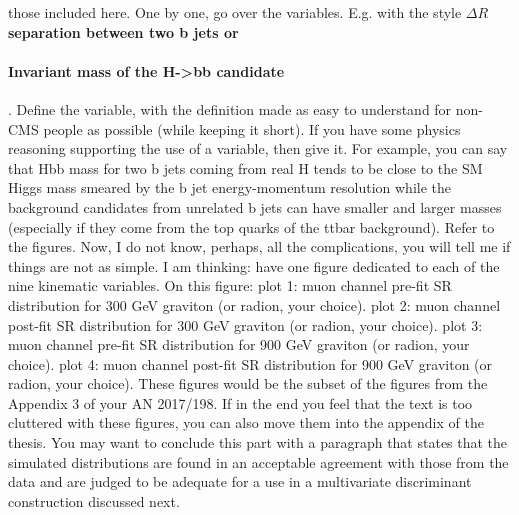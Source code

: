            those included here.
              One by one, go over the variables. E.g. with the style
           \bf{$\Delta R$ separation between two b jets} or \paragraph{Invariant mass of the H->bb candidate}.
           Define the variable, with the definition made as easy to understand for non-CMS people as
           possible (while keeping it short). If you have some physics reasoning supporting the use 
           of a variable, then give it. For example, you can say that Hbb mass for two b jets coming
           from real H tends to be close to the SM Higgs mass smeared by the b jet energy-momentum
           resolution while the background candidates from unrelated b jets can have smaller and larger
           masses (especially if they come from the top quarks of the ttbar background).
           Refer to the figures. 
           Now, I do not  know, perhaps, all the complications, you will tell me if things are not as simple.
           I am thinking: have one figure dedicated to each of the nine kinematic variables. On this figure:
               plot 1: muon channel pre-fit SR distribution for 300 GeV graviton (or radion, your choice).
               plot 2: muon channel post-fit SR distribution for 300 GeV graviton (or radion, your choice).
               plot 3: muon channel pre-fit SR distribution for 900 GeV graviton (or radion, your choice).
               plot 4: muon channel post-fit SR distribution for 900 GeV graviton (or radion, your choice).
           These figures would be the subset of the figures from the Appendix 3 of your AN 2017/198.
           If in the end you feel that the text is too cluttered with these figures, you can also move them
           into the appendix of the thesis.
              You may want to conclude this part with a paragraph that states that the simulated 
           distributions are found in an acceptable agreement with those from the data and are 
           judged to be adequate for a use in a multivariate discriminant construction discussed next.

